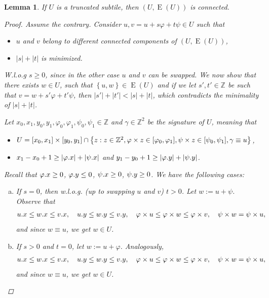 \documentclass[11pt, letterpaper]{article}
\theoremstyle{plain}
\newtheorem{lemma}{Lemma}
\theoremstyle{definition}
\theoremstyle{remark}
\newcommand{\Z}{\mathbb{Z}}
\renewcommand{\phi}{\varphi}
\newcommand{\set}[1]{\left\lbrace #1 \right\rbrace}
\newcommand{\eq}[1]{\begin{align*} #1 \end{align*}}
\DeclareMathOperator*{\Edges}{E}
\begin{document}
\begin{lemma}\label{lattice_graph_connectivity}
	If $U$ is a truncated subtile, then $(U, \Edges(U))$ is connected.
	\begin{proof}
		Assume the contrary.
		Consider $u, v = u + s \phi + t \psi \in U$ such that
		\begin{itemize}
			\item $u$ and $v$ belong to different connected components of $(U, \Edges(U))$,
			\item $|s| + |t|$ is minimized.
		\end{itemize}
		W.l.o.g $s \ge 0$, since in the other case $u$ and $v$ can be swapped.
		We now show that there exists $w \in U$, such that $\set{u, w} \in \Edges(U)$ and if we let $s', t' \in \Z$ be such that $v = w + s'\phi + t'\psi$, then $|s'| + |t'| < |s| + |t|$, which contradicts the minimality of $|s| + |t|$. 
	
		Let $x_0, x_1, y_0, y_1, \phi_0, \phi_1, \psi_0, \psi_1 \in \Z$ and $\gamma \in \Z^2$ be the signature of $U$, meaning that
		\begin{itemize}
			\item $ U = [x_0, x_1] \times [y_0, y_1] \cap \set{z : z \in \Z^2, \h{z} \in [\phi_0, \phi_1], \s{z} \in [\psi_0, \psi_1], \gamma \equiv u}$,
			\item $x_1 - x_0 + 1 \ge |\x{\phi}| + |\x{\psi}|$ and $y_1 - y_0 + 1 \ge |\y{\phi}| + |\y{\psi}|$.
		\end{itemize}
		
		Recall that $\x{\phi} \ge 0$, $\y{\phi} \le 0$, $\psi.x \ge 0$, $\psi.y \ge 0$. We have the following cases:
		\begin{enumerate}[(a)]
			\item \label{it:s0_tneg} If $s = 0$, then w.l.o.g. (up to swapping $u$ and $v$) $t > 0$. Let $w := u + \psi$. Observe that
				\eq{
					\x{u} \le \x{w} \le \x{v}, \quad \y{u} \le \y{w} \le \y{v}, \quad \h{u} \le \h{w} \le \h{v}, \quad \s{w} = \s{u},
				}
				and since $w \equiv u$, we get $w \in U$. 
			
			\item If $s > 0$ and $t = 0$, let $w := u + \phi$. Analogously, 
				\eq{
					\x{u} \le \x{w} \le \x{v}, \quad \y{u} \le \y{w} \le \y{v}, \quad \h{u} \le \h{w} \le \h{v}, \quad \s{w} = \s{u},
				}
				and since $w \equiv u$, we get $w \in U$. 
			

\end{enumerate}
\end{proof}
\end{lemma}
\end{document}
